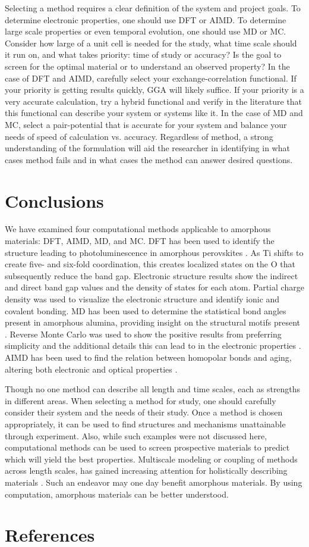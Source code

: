 \documentclass[3p,review,12pt]{elsarticle}
\begin{document}
Selecting a method requires a clear definition of the system and project goals. To determine electronic properties, one should use DFT or AIMD. To determine large scale properties or even temporal evolution, one should use MD or MC. Consider how large of a unit cell is needed for the study, what time scale should it run on, and what takes priority: time of study or accuracy? Is the goal to screen for the optimal material or to understand an observed property? In the case of DFT and AIMD, carefully select your exchange-correlation functional. If your priority is getting results quickly, GGA will likely suffice. If your priority is a very accurate calculation, try a hybrid functional and verify in the literature that this functional can describe your system or systems like it. In the case of MD and MC, select a pair-potential that is accurate for your system and balance your needs of speed of calculation vs. accuracy. Regardless of method, a strong understanding of the formulation will aid the researcher in identifying in what cases method fails and in what cases the method can answer desired questions.




\section{Conclusions}
We have examined four computational methods applicable to amorphous materials: DFT, AIMD, MD, and MC. DFT has been used to identify the structure leading to photoluminescence in amorphous perovskites \cite{Longo2004}. As Ti shifts to create five- and six-fold coordination, this creates localized states on the O that subsequently reduce the band gap. Electronic structure results show the indirect and direct band gap values and the density of states for each atom. Partial charge density was used to visualize the electronic structure and identify ionic and covalent bonding. 
MD has been used to determine the statistical bond angles present in amorphous alumina, providing insight on the structural motifs present \cite{Gutierrez2002}. Reverse Monte Carlo was used to show the positive results from preferring simplicity and the additional details this can lead to in the electronic properties \cite{Cliffe2017}. AIMD has been used to find the relation between homopolar bonds and aging, altering both electronic and optical properties \cite{Raty2015}.
\par Though no one method can describe all length and time scales, each as strengths in different areas. When selecting a method for study, one should carefully consider their system and the needs of their study. Once a method is chosen appropriately, it can be used to find structures and mechanisms unattainable through experiment. Also, while such examples were not discussed here, computational methods can  be used to screen prospective materials to predict which will yield the best properties. Multiscale modeling or coupling of methods across length scales, has gained increasing attention for holistically describing materials \cite{DePablo2007}. Such an endeavor may one day benefit amorphous materials. By using computation, amorphous materials can be better understood.




\section*{References}



\end{document}

